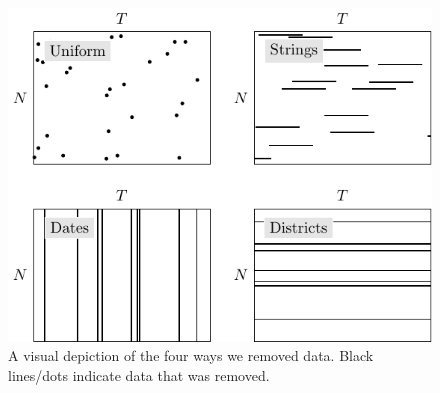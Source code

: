 \begin{figure}[t]
    \begin{center}
        \includegraphics[width=0.6\linewidth]{Figures/missing.pdf}
    \end{center}
    \caption{\small{A visual depiction of the four ways we removed data. Black lines/dots indicate data that was removed. }}
    \label{fig:missing_data}
\end{figure}




